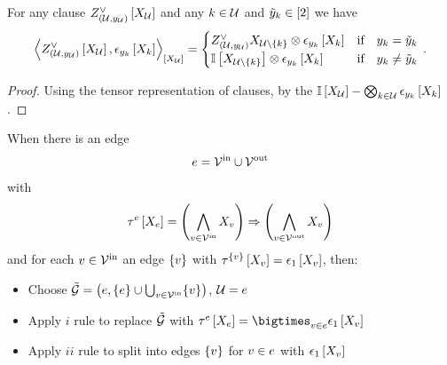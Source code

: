 \begin{lemma}
    For any clause $Z^{\lor}_{(\mathcal{U},y_{\mathcal{U}})}\left[X_{\mathcal{U}}\right]$ and any $k\in\mathcal{U}$ and $\tilde{y}_{k}\in[2]$ we have
    \begin{align*}
        \left\langle 
            Z^{\lor}_{(\mathcal{U},y_{\mathcal{U}})}\left[X_{\mathcal{U}}\right],\epsilon_{y_{k}}\left[X_{k}\right]
        \right\rangle_{\left[ X_{\mathcal{U}} \right]}
        = \begin{cases}
              Z^{\lor}_{(\mathcal{U},y_{\mathcal{U}})}{X_{\mathcal{U}\backslash\{k\}}} \otimes \epsilon_{y_{k}}\left[X_{k}\right]
              & \text{if}\quad y_{k} = \tilde{y}_{k} \\
              \mathbb{I}\left[X_{\mathcal{U}\backslash\{k\}}\right]\otimes \epsilon_{y_{k}}\left[X_{k}\right]
              & \text{if}\quad y_{k} \neq \tilde{y}_{k}
        \end{cases} \, .
    \end{align*}
\end{lemma}
\begin{proof}
    Using the tensor representation of clauses, by the $\mathbb{I}\left[X_{\mathcal{U}}\right]-\bigotimes_{k\in\mathcal{U}}\epsilon_{y_{k}}\left[X_{k}\right]$.
\end{proof}



\begin{example}
    When there is an edge
    \begin{align*}
        e
        = \mathcal{V}^{\mathrm{in}} \cup \mathcal{V}^{\mathrm{out}}
    \end{align*}
    with
    \begin{align*}
        \tau^{e}\left[X_{e}\right]
        = \left(\bigwedge_{v\in\mathcal{V}^{\mathrm{in}}}X_{v}\right) \Rightarrow \left(\bigwedge_{v\in\mathcal{V}^{\mathrm{out}}}X_{v}\right)
    \end{align*}
    and for each $v\in\mathcal{V}^{\mathrm{in}}$ an edge $\{v\}$ with $\tau^{\{v\}}\left[X_{v}\right]=\epsilon_{1}\left[X_{v}\right]$, then:
    \begin{itemize}
        \item Choose $\tilde{\mathcal{G}}=\left(e,\{e\}\cup\bigcup_{v\in\mathcal{V}^{\mathrm{in}}}\{v\}\right)$, $\mathcal{U}=e$
        \item Apply $i$ rule to replace $\tilde{\mathcal{G}}$ with $\hypercoreofat{\edge}{\catvariableof{\edge}}=\bigtimes_{\node\in\edge}\tbasisat{\catvariableof{\node}}$
        \item Apply $ii$ rule to split into edges $\{v\}$ for $v\in e$ with $\epsilon_{1}\left[X_{v}\right]$
    \end{itemize}
\end{example}

